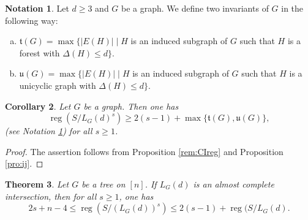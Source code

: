 \documentclass[11pt,a4paper,reqno]{amsart}
\newtheorem{thm}{Theorem}[section]
\newtheorem{cor}[thm]{Corollary}
\theoremstyle{definition}
\newtheorem{notation}[thm]{Notation}
\numberwithin{equation}{section}
\DeclareMathOperator{\reg}{reg}
\begin{document}
\begin{notation} \label{maxind}
    Let $d\geq 3$ and $G$ be a graph. We define two invariants of $G$ in the following way:
    \begin{enumerate}[(a)]
        \item $\mathfrak{t}(G) = \max\{|E(H)| \mid H$ is an induced subgraph of  $G$ such that $H$ is a forest with $\Delta(H) \leq d\}$.
        \item $\mathfrak{u}(G) = \max\{|E(H)| \mid H$ is an induced subgraph of  $G$ such that  $H$  is a unicyclic graph with $\Delta(H) \leq d\}$.
    \end{enumerate}   
\end{notation}

\begin{cor} \label{Cor:lower}
    Let $G$ be a graph. Then one has $$\reg(S/L_G(d)^s) \geq 2(s-1)+\max\{\mathfrak{t}(G),\mathfrak{u}(G)\},$$ (see Notation \ref{maxind}) for all $s\geq 1$. 
\end{cor}

\begin{proof}
    The assertion follows from Proposition \ref{rem:CIreg} and Proposition \ref{pro:ij}.
\end{proof}


\begin{thm}\label{thm4:t}
    Let $G$ be a tree on $[n]$. If $L_G(d)$ is an almost complete intersection, then for all $s\geq 1$, one has 
    $$2s + n-4 \leq \reg (S/(L_G(d))^s) \leq 2(s-1) + \reg (S/L_{G}(d).$$
\end{thm}
\end{document}
